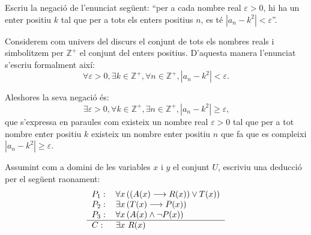 \begin{exercici}
Escriu la negació de l'enunciat següent: \enquote{per a cada
nombre real $\varepsilon>0$, hi ha un enter positiu $k$ tal que per a tots els
enters positius $n$, es té $\left\vert a_{n}-k^{2}\right\vert
<\varepsilon$}.
\end{exercici}

\begin{solucio}
Considerem com univers del discurs el conjunt de tots els nombres reals i
simbolitzem per $\mathbb{Z}^{+}$ el conjunt del enters positius. D'aquesta
manera l'enunciat s'escriu formalment així:
\[
\forall\varepsilon>0,\exists k\in\mathbb{Z}^{+},\forall n\in\mathbb{Z}%
^{+},\left\vert a_{n}-k^{2}\right\vert <\varepsilon\text{.}%
\]


Aleshores la seva negació és:%
\[
\exists\varepsilon>0,\forall k\in\mathbb{Z}^{+},\exists n\in\mathbb{Z}%
^{+},\left\vert a_{n}-k^{2}\right\vert \geq\varepsilon\text{,}%
\]
que s'expressa en paraules com existeix un nombre real $\varepsilon>0$ tal que
per a tot nombre enter positiu $k$ existeix un nombre enter positiu $n$ que fa
que es compleixi $\left\vert a_{n}-k^{2}\right\vert \geq\varepsilon$.
\end{solucio}

\begin{exercici}
Assumint com a domini de les variables $x$ i $y$ el conjunt $U$, escriviu una
deducció per el següent raonament:%
\[%
\begin{tabular}
[c]{ll}%
$P_{1}:$ & $\forall x\left(  \left(  A(x)\longrightarrow R(x)\right)  \vee
T(x)\right)  $\\
$P_{2}:$ & $\exists x\left(  T(x)\longrightarrow P(x)\right)  $\\
$P_{3}:$ & $\forall x\left(  A(x)\wedge\lnot P(x)\right)  $\\\hline
$C:$ & $\exists x\ R(x)$%
\end{tabular}
\]

\end{exercici}

